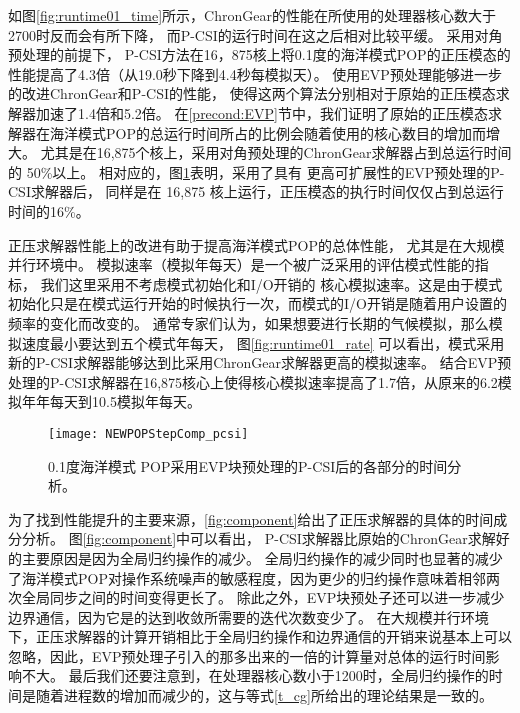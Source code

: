如图\ref{fig:runtime01_time}所示，ChronGear的性能在所使用的处理器核心数大于2700时反而会有所下降，
而P-CSI的运行时间在这之后相对比较平缓。 
采用对角预处理的前提下， P-CSI方法在16，875核上将0.1度的海洋模式POP的正压模态的性能提高了4.3倍（从19.0秒下降到4.4秒每模拟天）。 
使用EVP预处理能够进一步的改进ChronGear和P-CSI的性能， 使得这两个算法分别相对于原始的正压模态求解器加速了1.4倍和5.2倍。
在\ref{precond:EVP}节中，我们证明了原始的正压模态求解器在海洋模式POP的总运行时间所占的比例会随着使用的核心数目的增加而增大。
尤其是在16,875个核上，采用对角预处理的ChronGear求解器占到总运行时间的 50\%以上。 
相对应的，图\ref{fig:StepComp_pcsi}表明，采用了具有 更高可扩展性的EVP预处理的P-CSI求解器后， 同样是在 16,875 核上运行，正压模态的执行时间仅仅占到总运行时间的16\%。 

 
正压求解器性能上的改进有助于提高海洋模式POP的总体性能， 尤其是在大规模并行环境中。
模拟速率（模拟年每天）是一个被广泛采用的评估模式性能的指标， 我们这里采用不考虑模式初始化和I/O开销的 核心模拟速率。这是由于模式初始化只是在模式运行开始的时候执行一次，而模式的I/O开销是随着用户设置的频率的变化而改变的。 
通常专家们认为，如果想要进行长期的气候模拟，那么模拟速度最小要达到五个模式年每天\cite{dennis2012computational}， 图\ref{fig:runtime01_rate} 可以看出，模式采用新的P-CSI求解器能够达到比采用ChronGear求解器更高的模拟速率。 
结合EVP预处理的P-CSI求解器在16,875核心上使得核心模拟速率提高了1.7倍，从原来的6.2模拟年年每天到10.5模拟年每天。 
 

\begin {figure}
\centering
\texttt{[image: NEWPOPStepComp\_pcsi]}
\caption[] { 0.1度海洋模式 POP采用EVP块预处理的P-CSI后的各部分的时间分析。 \label{fig:StepComp_pcsi}}
\end{figure}



为了找到性能提升的主要来源，\ref{fig:component}给出了正压求解器的具体的时间成分分析。 
图\ref{fig:component}中可以看出， P-CSI求解器比原始的ChronGear求解好的主要原因是因为全局归约操作的减少。 
全局归约操作的减少同时也显著的减少了海洋模式POP对操作系统噪声的敏感程度\cite{ferreira}，因为更少的归约操作意味着相邻两次全局同步之间的时间变得更长了。 
除此之外，EVP块预处子还可以进一步减少边界通信，因为它是的达到收敛所需要的迭代次数变少了。 
在大规模并行环境下，正压求解器的计算开销相比于全局归约操作和边界通信的开销来说基本上可以忽略，因此，EVP预处理子引入的那多出来的一倍的计算量对总体的运行时间影响不大。
最后我们还要注意到，在处理器核心数小于1200时，全局归约操作的时间是随着进程数的增加而减少的，这与等式\ref{t_cg}所给出的理论结果是一致的。

